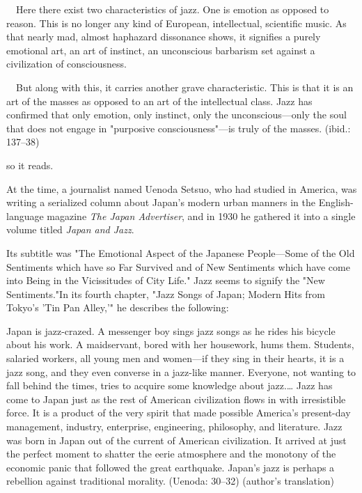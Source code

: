\begin{gquote}
　Here there exist two characteristics of jazz. One is emotion as opposed to reason. This is no longer any kind of European, intellectual, scientific music. As that nearly mad, almost haphazard dissonance shows, it signifies a purely emotional art, an art of instinct, an unconscious barbarism set against a civilization of consciousness.\par{}　But along with this, it carries another grave characteristic. This is that it is an art of the masses as opposed to an art of the intellectual class. Jazz has confirmed that only emotion, only instinct, only the unconscious—only the soul that does not engage in "purposive consciousness"—is truly of the masses. (ibid.: 137–38)
\end{gquote}

so it reads.

At the time, a journalist named Uenoda Setsuo, who had studied in America, was writing a serialized column about Japan's modern urban manners in the English-language magazine \textit{The Japan Advertiser}, and in 1930 he gathered it into a single volume titled \textit{Japan and Jazz}.

Its subtitle was "The Emotional Aspect of the Japanese People—Some of the Old Sentiments which have so Far Survived and of New Sentiments which have come into Being in the Vicissitudes of City Life." Jazz seems to signify the "New Sentiments."In its fourth chapter, "Jazz Songs of Japan; Modern Hits from Tokyo's 'Tin Pan Alley,'" he describes the following:

\begin{gquote}
Japan is jazz-crazed. A messenger boy sings jazz songs as he rides his bicycle about his work. A maidservant, bored with her housework, hums them. Students, salaried workers, all young men and women—if they sing in their hearts, it is a jazz song, and they even converse in a jazz-like manner. Everyone, not wanting to fall behind the times, tries to acquire some knowledge about jazz.… Jazz has come to Japan just as the rest of American civilization flows in with irresistible force. It is a product of the very spirit that made possible America's present-day management, industry, enterprise, engineering, philosophy, and literature. Jazz was born in Japan out of the current of American civilization. It arrived at just the perfect moment to shatter the eerie atmosphere and the monotony of the economic panic that followed the great earthquake. Japan's jazz is perhaps a rebellion against traditional morality. (Uenoda: 30–32) (author's translation)
\end{gquote}


